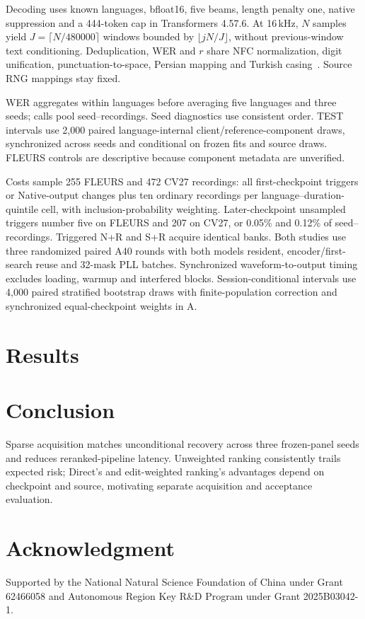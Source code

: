 \documentclass[conference,letterpaper]{IEEEtran}
\begin{document}
Decoding uses known languages, bfloat16, five beams, length penalty one, native suppression and a 444-token cap in Transformers 4.57.6. At 16\,kHz, $N$ samples yield $J=\lceil N/480000\rceil$ windows bounded by $\lfloor jN/J\rfloor$, without previous-window text conditioning.
Deduplication, WER and $r$ share NFC normalization, digit unification, punctuation-to-space, Persian mapping and Turkish casing~\cite{normalization}. Source RNG mappings stay fixed.

\begin{samepage}
WER aggregates within languages before averaging five languages and three seeds; calls pool seed--recordings. Seed diagnostics use consistent order. TEST intervals use 2,000 paired language-internal client/reference-component draws, synchronized across seeds and conditional on frozen fits and source draws. FLEURS controls are descriptive because component metadata are unverified.\par
\end{samepage}

Costs sample 255 FLEURS and 472 CV27 recordings: all first-checkpoint triggers or Native-output changes plus ten ordinary recordings per language--duration-quintile cell, with inclusion-probability weighting. Later-checkpoint unsampled triggers number five on FLEURS and 207 on CV27, or 0.05\% and 0.12\% of seed--recordings. Triggered N+R and S+R acquire identical banks. Both studies use three randomized paired A40 rounds with both models resident, encoder/first-search reuse and 32-mask PLL batches. Synchronized waveform-to-output timing excludes loading, warmup and interfered blocks. Session-conditional intervals use 4,000 paired stratified bootstrap draws with finite-population correction and synchronized equal-checkpoint weights in A.

\section{Results}

\section{Conclusion}
Sparse acquisition matches unconditional recovery across three frozen-panel seeds and reduces reranked-pipeline latency. Unweighted ranking consistently trails expected risk; Direct's and edit-weighted ranking's advantages depend on checkpoint and source, motivating separate acquisition and acceptance evaluation.
\section*{Acknowledgment}
Supported by the National Natural Science Foundation of China under Grant 62466058 and Autonomous Region Key R\&D Program under Grant 2025B03042-1.
\label{iscas:body-end}\clearpage\raggedbottom\balance
\label{iscas:references-start}

\end{document}
